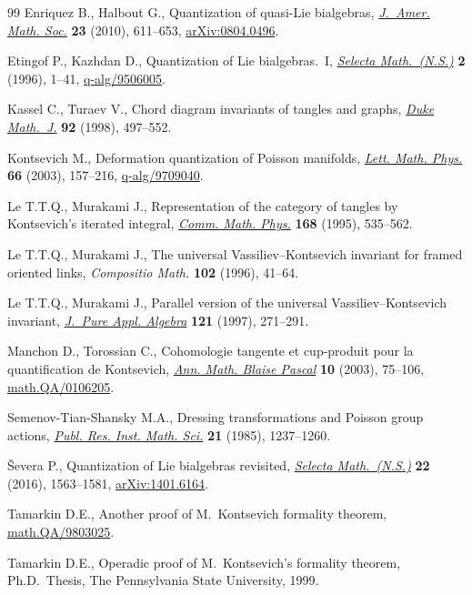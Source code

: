 \begin{thebibliography}{99}
Enriquez B., Halbout G., Quantization of quasi-{L}ie bialgebras,
 \href{http://dx.doi.org/10.1090/S0894-0347-10-00654-5}{\textit{J.~Amer. Math. Soc.}} \textbf{23} (2010), 611--653,
 \href{http://arxiv.org/abs/0804.0496}{arXiv:0804.0496}.

Etingof P., Kazhdan D., Quantization of {L}ie bialgebras.~{I}, \href{http://dx.doi.org/10.1007/BF01587938}{\textit{Selecta
 Math.~(N.S.)}} \textbf{2} (1996), 1--41, \mbox{\href{http://arxiv.org/abs/q-alg/9506005}{q-alg/9506005}}.

Kassel C., Turaev V., Chord diagram invariants of tangles and graphs,
 \href{http://dx.doi.org/10.1215/S0012-7094-98-09215-8}{\textit{Duke Math.~J.}} \textbf{92} (1998), 497--552.

Kontsevich M., Deformation quantization of {P}oisson manifolds, \href{http://dx.doi.org/10.1023/B:MATH.0000027508.00421.bf}{\textit{Lett.
 Math. Phys.}} \textbf{66} (2003), 157--216, \mbox{\href{http://arxiv.org/abs/q-alg/9709040}{q-alg/9709040}}.

Le T.T.Q., Murakami J., Representation of the category of tangles by
 {K}ontsevich's iterated integral, \href{http://dx.doi.org/10.1007/BF02101842}{\textit{Comm. Math. Phys.}} \textbf{168}
 (1995), 535--562.

Le T.T.Q., Murakami J., The universal {V}assiliev--{K}ontsevich invariant for
 framed oriented links, \textit{Compositio Math.} \textbf{102} (1996), 41--64.

Le T.T.Q., Murakami J., Parallel version of the universal
 {V}assiliev--{K}ontsevich invariant, \href{http://dx.doi.org/10.1016/S0022-4049(96)00054-0}{\textit{J.~Pure Appl. Algebra}}
 \textbf{121} (1997), 271--291.

Manchon D., Torossian C., Cohomologie tangente et cup-produit pour la
 quantif\/ication de {K}ontsevich, \href{http://dx.doi.org/10.5802/ambp.168}{\textit{Ann. Math. Blaise Pascal}} \textbf{10}
 (2003), 75--106, \href{http://arxiv.org/abs/math.QA/0106205}{math.QA/0106205}.

Semenov-Tian-Shansky M.A., Dressing transformations and {P}oisson group
 actions, \href{http://dx.doi.org/10.2977/prims/1195178514}{\textit{Publ. Res. Inst. Math. Sci.}} \textbf{21} (1985), 1237--1260.

{\v{S}}evera P., Quantization of {L}ie bialgebras revisited, \href{http://dx.doi.org/10.1007/s00029-016-0227-0}{\textit{Selecta
 Math.~(N.S.)}} \textbf{22} (2016), 1563--1581, \href{http://arxiv.org/abs/1401.6164}{arXiv:1401.6164}.

Tamarkin D.E., Another proof of {M}.~{K}ontsevich formality theorem,
 \href{http://arxiv.org/abs/math.QA/9803025}{math.QA/9803025}.

Tamarkin D.E., Operadic proof of {M}.~{K}ontsevich's formality theorem, Ph.D.~Thesis, The Pennsylvania State University, 1999.

\end{thebibliography}
